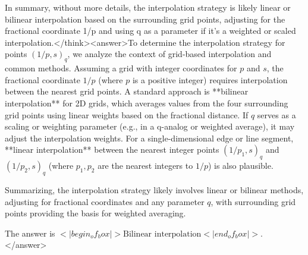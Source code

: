 In summary, without more details, the interpolation strategy is likely linear or bilinear interpolation based on the surrounding grid points, adjusting for the fractional coordinate 1/p and using q as a parameter if it's a weighted or scaled interpolation.</think><answer>To determine the interpolation strategy for points \((1/p, s)_q\), we analyze the context of grid-based interpolation and common methods. Assuming a grid with integer coordinates for \(p\) and \(s\), the fractional coordinate \(1/p\) (where \(p\) is a positive integer) requires interpolation between the nearest grid points. A standard approach is **bilinear interpolation** for 2D grids, which averages values from the four surrounding grid points using linear weights based on the fractional distance. If \(q\) serves as a scaling or weighting parameter (e.g., in a q-analog or weighted average), it may adjust the interpolation weights. For a single-dimensional edge or line segment, **linear interpolation** between the nearest integer points \((1/p_1, s)_q\) and \((1/p_2, s)_q\) (where \(p_1, p_2\) are the nearest integers to \(1/p\)) is also plausible.  

Summarizing, the interpolation strategy likely involves linear or bilinear methods, adjusting for fractional coordinates and any parameter \(q\), with surrounding grid points providing the basis for weighted averaging.  

The answer is \(<|begin_of_box|>\text{Bilinear interpolation}<|end_of_box|>\).</answer>